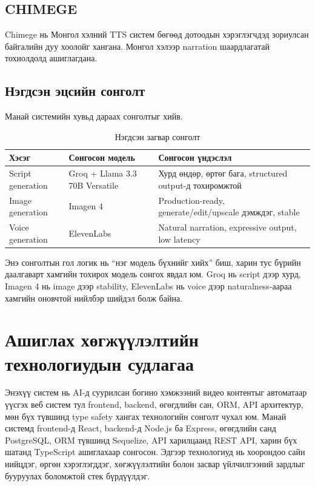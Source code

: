 \subsection{CHIMEGE}

Chimege нь Монгол хэлний TTS систем бөгөөд дотоодын хэрэглэгчдэд зориулсан байгалийн дуу хоолойг хангана. Монгол хэлээр narration шаардлагатай тохиолдолд ашиглагдана.

\subsection{Нэгдсэн эцсийн сонголт}

Манай системийн хувьд дараах сонголтыг хийв.

\begin{table}[H]
\centering
\small
\begin{tabular}{|p{2.5cm}|p{4cm}|p{6.5cm}|}
\hline
\textbf{Хэсэг} & \textbf{Сонгосон модель} & \textbf{Сонгосон үндэслэл} \\
\hline
Script generation & Groq + Llama 3.3 70B Versatile & Хурд өндөр, өртөг бага, structured output-д тохиромжтой \\
\hline
Image generation & Imagen 4 & Production-ready, generate/edit/upscale дэмждэг, stable \\
\hline
Voice generation & ElevenLabs & Natural narration, expressive output, low latency \\
\hline
\end{tabular}
\caption{Нэгдсэн загвар сонголт}
\end{table}

Энэ сонголтын гол логик нь ``нэг модель бүхнийг хийх'' биш, харин тус бүрийн даалгаварт хамгийн тохирох модель сонгох явдал юм. Groq нь script дээр хурд, Imagen 4 нь image дээр stability, ElevenLabs нь voice дээр naturalness-аараа хамгийн оновчтой нийлбэр шийдэл болж байна.

\section{Ашиглах хөгжүүлэлтийн технологиудын судлагаа}

Энэхүү систем нь AI-д суурилсан богино хэмжээний видео контентыг автоматаар үүсгэх веб систем тул frontend, backend, өгөгдлийн сан, ORM, API архитектур, мөн бүх түвшинд type safety хангах технологийн сонголт чухал юм. Манай системд frontend-д React, backend-д Node.js ба Express, өгөгдлийн санд PostgreSQL, ORM түвшинд Sequelize, API харилцаанд REST API, харин бүх шатанд TypeScript ашиглахаар сонгосон. Эдгээр технологиуд нь хоорондоо сайн нийцдэг, өргөн хэрэглэгддэг, хөгжүүлэлтийн болон засвар үйлчилгээний зардлыг бууруулах боломжтой стек бүрдүүлдэг.


